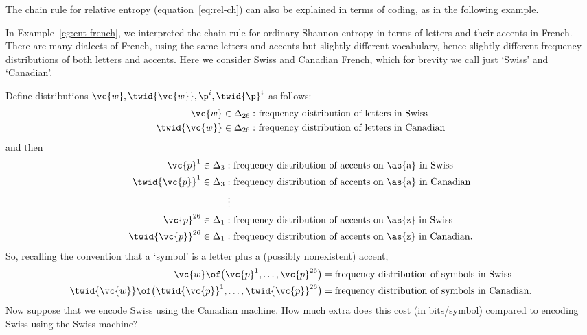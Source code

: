 The chain rule for relative entropy (equation~\eqref{eq:rel-ch}) can also
be explained in terms of coding, as in the following example.

\begin{example}
%
%
% 
In Example~\ref{eg:ent-french}, we interpreted the chain rule for ordinary
Shannon entropy in terms of letters and their accents in French.  There are
many dialects of French, using the same letters and accents but slightly
different vocabulary, hence slightly different frequency distributions of
both letters and accents.  Here we consider Swiss and Canadian French,
which for brevity we call just `Swiss' and `Canadian'.

Define distributions $\vc{w}, \twid{\vc{w}}, \p^i, \twid{\p}^i$ as follows:
%  
\begin{align*}
\vc{w} \in \Delta_{26}: &
\text{ frequency distribution of letters in Swiss}     \\
\twid{\vc{w}} \in \Delta_{26}:   &
\text{ frequency distribution of letters in Canadian}
\end{align*}
% 
and then
% 
\begin{align*}
\vc{p}^1 \in \Delta_3:  &
\text{ frequency distribution of accents on \as{a} in Swiss}      \\
\twid{\vc{p}}^1 \in \Delta_3:  &
\text{ frequency distribution of accents on \as{a} in Canadian}      \\
\vdots  \\
\vc{p}^{26} \in \Delta_1:  &
\text{ frequency distribution of accents on \as{z} in Swiss}      \\
\twid{\vc{p}}^{26} \in \Delta_1:  &
\text{ frequency distribution of accents on \as{z} in Canadian}.
\end{align*}
% 
So, recalling the convention that a `symbol' is a letter plus a (possibly
nonexistent) accent,
% 
\begin{align*}
\vc{w} \of \bigl(\vc{p}^1, \ldots, \vc{p}^{26}\bigr)      &
=
\text{frequency distribution of symbols in Swiss}  \\
\twid{\vc{w}} \of \bigl(\twid{\vc{p}}^1, \ldots, \twid{\vc{p}}^{26}\bigr)&
=
\text{frequency distribution of symbols in Canadian}.
\end{align*}
%
Now suppose that we encode Swiss using the Canadian machine.  How much
extra does this cost (in bits/symbol) compared to encoding Swiss using the
Swiss machine?


\end{example}
